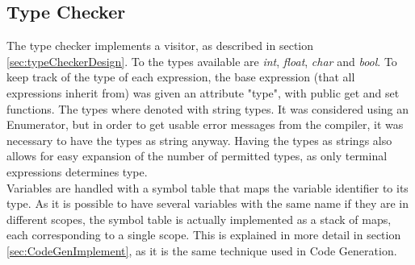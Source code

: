 \subsection{Type Checker}
The type checker implements a visitor, as described in section \ref{sec:typeCheckerDesign}. To the types available are \textit{int}, \textit{float}, \textit{char} and \textit{bool}. To keep track of the type of each expression, the base expression (that all expressions inherit from) was given an attribute "type", with public get and set functions. The types where denoted with string types. It was considered using an Enumerator, but in order to get usable error messages from the \lang{} compiler, it was necessary to have the types as string anyway. Having the types as strings also allows for easy expansion of the number of permitted types, as only terminal expressions determines type.\\
Variables are handled with a symbol table that maps the variable identifier to its type. As it is possible to have several variables with the same name if they are in different scopes, the symbol table is actually implemented as a stack of maps, each corresponding to  a single scope. This is explained in more detail in section \ref{sec:CodeGenImplement}, as it is the same technique used in Code Generation.